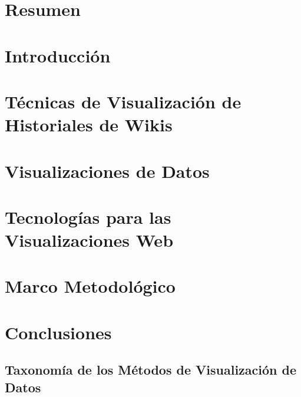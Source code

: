 \documentclass[12pt, twoside]{report}
\begin{document}


\chapter*{Resumen}


\tableofcontents

\listoffigures

\listoftables

\lstlistoflistings

\chapter*{Introducción}


\chapter{Técnicas de Visualización de Historiales de Wikis}


\chapter{Visualizaciones de Datos}


\chapter{Tecnologías para las Visualizaciones Web}


\chapter{Marco Metodológico}


\chapter*{Conclusiones}


\begin{appendices}
  \chapter{Taxonomía de los Métodos de Visualización de Datos}
  
\end{appendices}

\printbibliography
\end{document}
